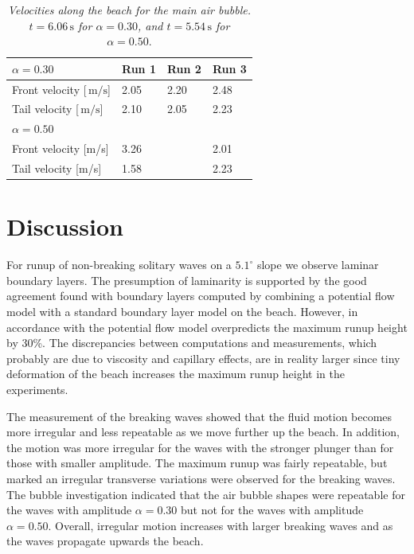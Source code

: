 \documentclass[review, authoryear]{elsarticle}
\newcommand{\s}{\,\mbox{s}}
\newcommand{\mps}{\,\mbox{m/s}}
\begin{document}
 
\begin{table}[]
\centering
\caption{\textit{ Velocities along the beach for the main air bubble. $t=6.06\s$ for $\alpha=0.30$, and $t=5.54\s$ for $\alpha=0.50$}.}
\label{vel_bubb}
\begin{tabular}{llll}
\hline
{\bf $\alpha=0.30$}                    & Run 1 & Run 2 & Run 3 \\ \hline
Front velocity {[}$\mps${]}  & 2.05  & 2.20  & 2.48  \\
Tail velocity {[}$\mps${]}  & 2.10  & 2.05  & 2.23  \\ \hline
{\bf $\alpha=0.50$}                    &       &       &       \\ \hline
Front velocity {[}m/s{]}  & 3.26  &   & 2.01  \\
Tail velocity {[}m/s{]}   & 1.58  &   & 2.23 
\end{tabular}
\end{table} 
 
 
\section{Discussion}
\label{con_rem}

For runup of non-breaking solitary waves on a $5.1^\circ$ slope we 
observe laminar boundary layers. The presumption of laminarity is
 supported by the good agreement found with boundary layers computed 
by combining a potential flow model with a standard boundary layer model on the beach. However, in accordance with \cite{pedersen2013runup} the
potential flow model overpredicts the
maximum runup height by  30\%.  
The discrepancies between computations and measurements, which probably are due to viscosity and capillary effects, are in reality larger since tiny deformation of the beach increases the maximum runup height in the experiments.

The measurement of the breaking waves showed that the fluid motion becomes more irregular and less repeatable as we move further up the beach. In addition, the motion was more irregular for the waves with the stronger plunger than for those with smaller amplitude. The maximum runup was fairly repeatable, but marked an irregular
transverse  variations were observed for the breaking waves. The bubble investigation indicated
 that the air bubble shapes  were repeatable  for the waves with amplitude $\alpha=0.30$ but not for the waves with amplitude $\alpha=0.50$. Overall, irregular motion increases with larger breaking waves and as the waves propagate upwards the beach.  
\end{document}
